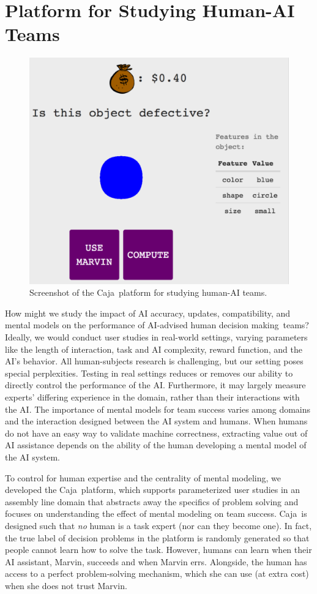 \documentclass[letterpaper]{article} %
\newcommand{\?}{\mbox{?}}
\newcommand{\name}{AI-advised human decision making}
\newcommand{\plat}{{\sc Caja}}
\begin{document}
\section{Platform for Studying Human-AI Teams}
\begin{figure}[t]
    \centering
    \includegraphics[width=0.8\linewidth]{tutorial-1.png}
    \caption{Screenshot of the \plat\ platform for studying human-AI teams.}
    \label{fig:ui}
\end{figure}  

How might we study the impact of AI accuracy, updates, compatibility, and mental models on the performance of \name\ teams? Ideally, we would conduct user studies in real-world settings, varying parameters like the length of interaction, task and AI complexity, reward function, and the AI's behavior. All human-subjects research is challenging, but our setting poses special perplexities. Testing in real settings reduces or removes our ability to directly control the performance of the AI. Furthermore, it may largely measure experts' differing experience in the domain, rather than their interactions with the AI.
The importance of mental models for team success
varies among domains and the interaction designed between the AI system and humans. When humans do not have an easy way to validate machine correctness, extracting value out of AI assistance depends on the ability of the human developing a mental model of the AI system. 

To control for human expertise and the centrality of mental modeling, we developed the \plat\ platform, which supports parameterized user studies in an assembly line domain that abstracts away the specifics of problem solving and focuses on understanding the effect of mental modeling on team success. \plat\ is designed such that {\em no} human is a task expert (nor can they become one). In fact, the true label of decision problems in the platform is randomly generated so that people cannot learn how to solve the task. However, humans can learn when their AI assistant, Marvin, succeeds and when Marvin errs. Alongside, the human has access to a perfect problem-solving mechanism, which she can use (at extra cost) when she does not trust Marvin. 
\end{document}
